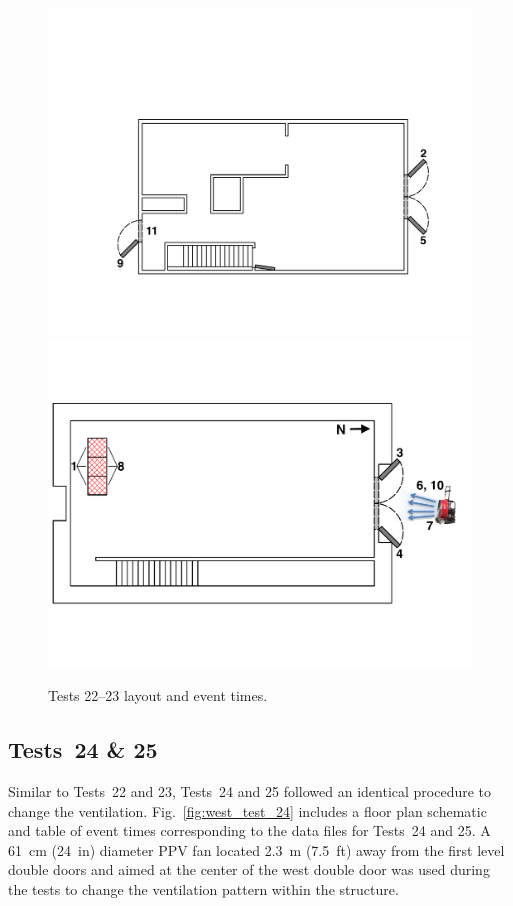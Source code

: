 \documentclass[12pt,oneside]{book}
\begin{document}
\begin{figure}[!ht]
\begin{minipage}[b]{0.9\columnwidth}
	\vspace{15pt}
	\centering
	\includegraphics[width=\columnwidth]{../Figures/Floor_Plans/West_Structure_2nd_Floor_Test_22}
	\includegraphics[width=0.98\columnwidth]{../Figures/Floor_Plans/West_Structure_1st_Floor_Test_22}
\end{minipage}
\caption{Tests 22--23 layout and event times.}
\label{fig:west_test_22}
\end{figure}

\subsection{Tests~24 \& 25}
Similar to Tests~22 and 23, Tests~24 and 25 followed an identical procedure to change the ventilation. Fig.~\ref{fig:west_test_24} includes a floor plan schematic and table of event times corresponding to the data files for Tests~24 and 25. A 61~cm (24~in) diameter PPV fan located 2.3~m (7.5~ft) away from the first level double doors and aimed at the center of the west double door was used during the tests to change the ventilation pattern within the structure.
\end{document}

